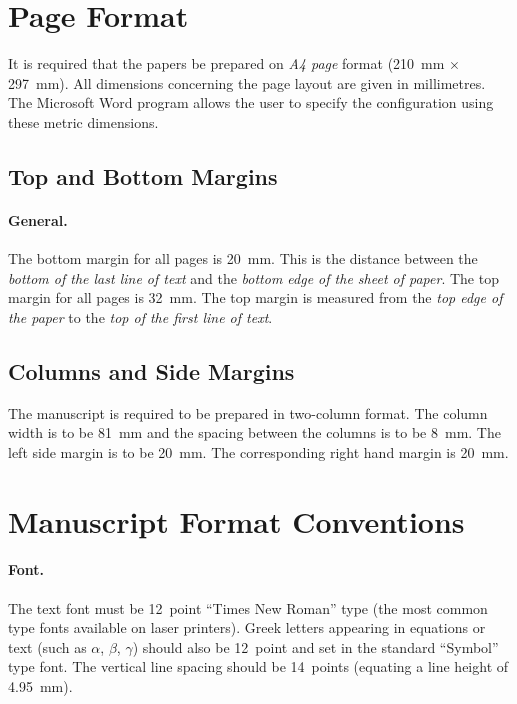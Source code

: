 \documentclass[bibtex,pagenumbers]{stabs2021}
\begin{document}
\section{Page Format}

It is required that the papers be prepared on \emph{A4 page} format
(210~mm \(\times\) 297~mm). All dimensions concerning the page layout
are given in millimetres. The Microsoft Word program allows the user
to specify the configuration using these metric dimensions.

\subsection{Top and Bottom Margins}

\paragraph{General.}

The bottom margin for all pages is 20~mm. This is the distance between
the \emph{bottom of the last line of text} and the \emph{bottom edge
of the sheet of paper}. The top margin for all pages is 32~mm. The top
margin is measured from the \emph{top edge of the paper} to the
\emph{top of the first line of text}.

\subsection{Columns and Side Margins}

The manuscript is required to be prepared in two-column format. The
column width is to be 81~mm and the spacing between the columns is to
be 8~mm. The left side margin is to be 20~mm. The corresponding right
hand margin is 20~mm.

\section{Manuscript Format Conventions}

\paragraph{Font.}

The text font must be 12~point ``Times New Roman'' type (the most
common type fonts available on laser printers). Greek letters
appearing in equations or text (such as \(\alpha\), \(\beta\),
\(\gamma\)) should also be 12~point and set in the standard ``Symbol''
type font. The vertical line spacing should be 14~points (equating a
line height of 4.95~mm).
\end{document}
